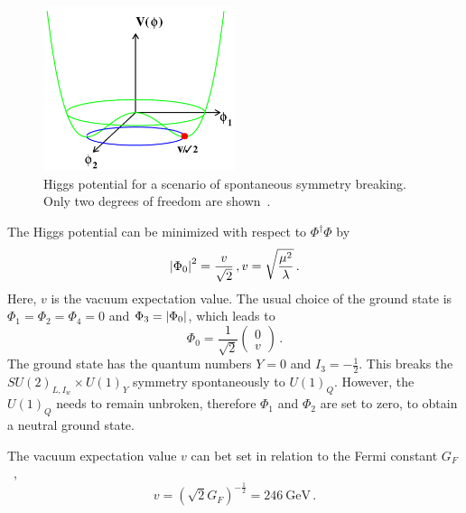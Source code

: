 \begin{figure}[tb]
    \centering
    \includegraphics[width=0.5\textwidth]{./figures/theory/higgs_potential.png}
    \caption{Higgs potential for a scenario of spontaneous symmetry breaking. Only two degrees of freedom are shown~\cite{MarkusPhd}.}\label{fig:theory:sm:higgspotential}
\end{figure}

The Higgs potential can be minimized with respect to $\Phi^\dagger\Phi$ by
\begin{equation}
    \left|\Phi_0\right|^2 = \frac{v}{\sqrt{2}} \,, v = \sqrt{\frac{\mu^2}{\lambda}} \,.
\end{equation}
Here, $v$ is the vacuum expectation value.
The usual choice of the ground state is $\Phi_1 = \Phi_2 = \Phi_4 = 0$ and $\Phi_3 = \left|\Phi_0\right|$, which leads to
\begin{equation}
    \label{eq:theo:higgs:doublet}
    \Phi_0 = \frac{1}{\sqrt{2}}
    \begin{pmatrix}
        0 \\ v
    \end{pmatrix} \,.
\end{equation}
The ground state has the quantum numbers $Y = 0$ and $I_3 = - \frac{1}{2}$.
This breaks the $SU{(2)}_{L,I_w} \times U{(1)}_Y$ symmetry spontaneously to $U{(1)}_Q$.
However, the $U{(1)}_Q$ needs to remain unbroken, therefore $\Phi_1$ and $\Phi_2$ are set to zero, to obtain a neutral ground state.

The vacuum expectation value $v$ can bet set in relation to the Fermi constant $G_F$~\cite{PDG},
\begin{equation}
    v = {\left(\sqrt{2} G_F \right)}^{-\frac{1}{2}} = \SI{246}{\GeV} \,.
\end{equation}

